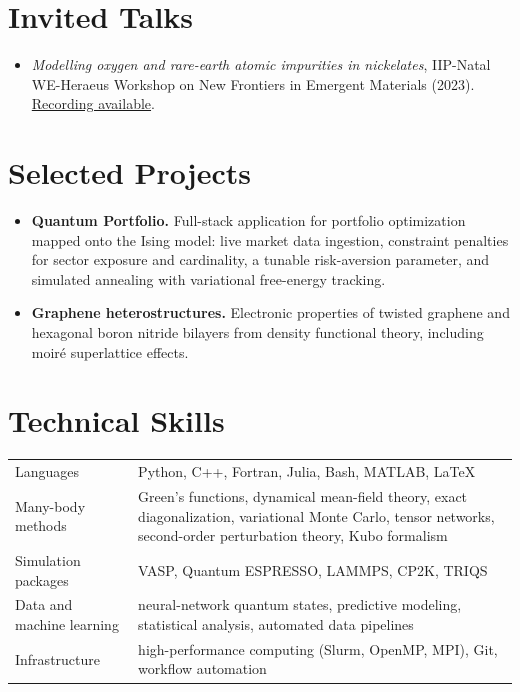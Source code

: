 \documentclass[10pt,a4paper]{article}
\begin{document}
\section{Invited Talks}

\begin{itemize}
  \item \emph{Modelling oxygen and rare-earth atomic impurities in nickelates},
        IIP-Natal WE-Heraeus Workshop on New Frontiers in Emergent Materials (2023).
        \href{https://www.youtube.com/live/tUv6uxbzKBw}{Recording available}.
\end{itemize}

\section{Selected Projects}

\begin{itemize}
  \item \textbf{Quantum Portfolio.} Full-stack application for portfolio optimization
        mapped onto the Ising model: live market data ingestion, constraint penalties for
        sector exposure and cardinality, a tunable risk-aversion parameter, and simulated
        annealing with variational free-energy tracking.
  \item \textbf{Graphene heterostructures.} Electronic properties of twisted graphene and
        hexagonal boron nitride bilayers from density functional theory, including moiré
        superlattice effects.
\end{itemize}

\section{Technical Skills}

\begin{tabular}{@{}p{4.2cm}p{12.2cm}@{}}
  {\ttfamily\footnotesize\color{dim}Languages} &
    Python, C++, Fortran, Julia, Bash, MATLAB, \LaTeX\\[3pt]
  {\ttfamily\footnotesize\color{dim}Many-body methods} &
    Green's functions, dynamical mean-field theory, exact diagonalization,
    variational Monte Carlo, tensor networks, second-order perturbation theory, Kubo formalism\\[3pt]
  {\ttfamily\footnotesize\color{dim}Simulation packages} &
    VASP, Quantum ESPRESSO, LAMMPS, CP2K, TRIQS\\[3pt]
  {\ttfamily\footnotesize\color{dim}Data and machine learning} &
    neural-network quantum states, predictive modeling, statistical analysis, automated data pipelines\\[3pt]
  {\ttfamily\footnotesize\color{dim}Infrastructure} &
    high-performance computing (Slurm, OpenMP, MPI), Git, workflow automation
\end{tabular}
\end{document}

